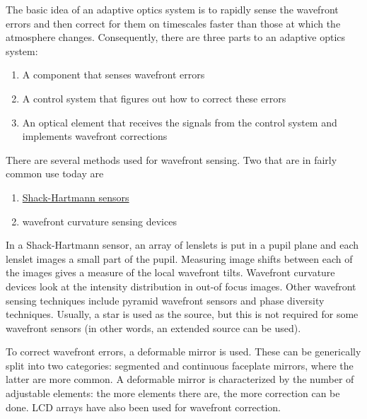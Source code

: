 \documentclass[12pt]{article}
\begin{document}
The basic idea of an adaptive optics system is to rapidly sense the
wavefront errors and then correct for them on timescales faster
than those at which the atmosphere changes. Consequently, there are
three parts to an adaptive optics system:
\begin{enumerate}
    \item A component that senses wavefront errors
    \item A control system that figures out how to correct these errors
    \item An optical element that receives the signals from the
        control system and implements wavefront corrections
\end{enumerate}
There are several methods used for wavefront sensing. Two that are in
fairly common use today are
\begin{enumerate}
    \item \href{%
        http://astronomy.nmsu.edu/holtz/a535/html/diagrams/a535/beckers3.htm}
        {Shack-Hartmann sensors}
    \item wavefront curvature sensing devices
\end{enumerate}
In a
Shack-Hartmann sensor, an array of lenslets is put in a pupil plane
and each lenslet images a small part of the pupil. Measuring image
shifts between each of the images gives a measure of the local
wavefront tilts. Wavefront curvature devices look at the intensity
distribution in out-of focus images. Other wavefront sensing
techniques include pyramid wavefront sensors and phase diversity
techniques. Usually, a star is used as the source, but this is not
required for some wavefront sensors
(in other words, an extended source can be used).

To correct wavefront errors, a deformable mirror is used.
These can be generically split into two categories:
segmented and continuous faceplate mirrors,
where the latter are more common.
A deformable mirror is characterized by the number of adjustable
elements: the more elements there are, the more correction can be done.
LCD arrays have also been used for wavefront correction.
\end{document}

